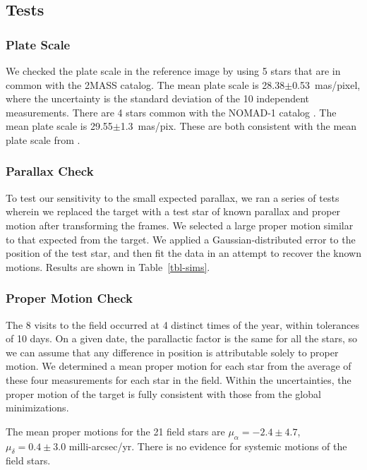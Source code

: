 \documentclass[12pt,preprint]{aastex}
\begin{document}
\subsection{Tests}

\subsubsection{Plate Scale}

We checked the plate scale in the reference image
by using 5 stars that are in common with
the 2MASS catalog. The mean plate scale is 28.38$\pm$0.53~mas/pixel, where
the uncertainty is the standard deviation of the 10 independent measurements.
There are 4 stars common with the NOMAD-1 catalog \citep{Za05}. The mean
plate scale is 29.55$\pm$1.3~mas/pix.
These are both consistent with the mean plate scale from \citet{AK04}.

\subsubsection{Parallax Check}
To test our sensitivity to the small expected parallax, we ran a series of
tests wherein we
replaced the target with a test star of known
parallax and proper motion after transforming the frames.
We selected a large proper motion similar to that expected from the target.
We applied a Gaussian-distributed error 
to the position of the test star, and then fit the data in an attempt to
recover the known motions. Results are shown in Table~\ref{tbl-sims}.

\subsubsection{Proper Motion Check}
The 8 visits to the field occurred at 4 distinct times of the year, within
tolerances of 10 days.
On a given date, the parallactic factor is the same for all the stars, so we
can assume that any difference in position is attributable solely to
proper motion. We determined a mean proper motion for each star from the average
of these four measurements for each star in the field. 
Within the uncertainties, the proper
motion of the target is fully consistent with those from the
global minimizations.

The mean proper motions for the 21 field stars are $\mu_\alpha = -2.4 \pm 4.7$,
$\mu_\delta = 0.4 \pm 3.0$ milli-arcsec/yr. There is no evidence for systemic
motions of the field stars.
\end{document}
